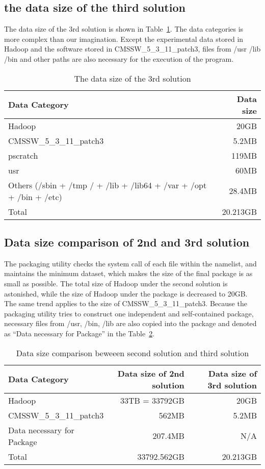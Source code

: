 \documentclass{article}
\begin{document}
\subsection{ the data size of the third solution}
\indent The data size of the 3rd solution is shown in Table~\ref{table:datasize-3rd}. The data categories is more complex than our imagination. Except the experimental data stored in Hadoop and the software stored in CMSSW\_5\_3\_11\_patch3, files from /usr /lib /bin and other paths are also necessary for the execution of the program.

\begin{table}
    \centering
    \begin{tabular}{|l|r|}
    \hline
    Data Category & Data size \\ \hline
    Hadoop & 20GB \\ \hline
    CMSSW\_5\_3\_11\_patch3 & 5.2MB \\ \hline
    pscratch & 119MB \\ \hline
    usr & 60MB \\ \hline
    Others (/sbin + /tmp / + /lib + /lib64 + /var + /opt + /bin + /etc) & 28.4MB \\ \hline
    Total & 20.213GB \\ \hline
    \end{tabular}
    \caption{The data size of the 3rd solution}
    \label{table:datasize-3rd}
\end{table}    

\subsection{ Data size comparison of 2nd and 3rd solution}
\indent The packaging utility checks the system call of each file within the namelist, and maintains the minimum dataset, which makes the size of the final package is as small as possible. The total size of Hadoop under the second solution is astonished, while the size of Hadoop under the package is decreased to 20GB. The same trend applies to the size of CMSSW\_5\_3\_11\_patch3. Because the packaging utility tries to construct one independent and self-contained package, necessary files  from /usr, /bin, /lib are also copied into the package and denoted as “Data necessary for Package” in the Table~\ref{table:datasize-2nd3rd}.

\begin{table}
    \centering
    \begin{tabular}{|l|r|r|}
    \hline
     Data Category & Data size of 2nd solution & Data size of 3rd solution \\ \hline
     Hadoop & 33TB = 33792GB & 20GB \\ \hline
     CMSSW\_5\_3\_11\_patch3 & 562MB & 5.2MB \\ \hline
     Data necessary for Package & 207.4MB & N/A \\ \hline
     Total & 33792.562GB & 20.213GB \\ \hline
    \end{tabular}
    \caption{Data size comparison beweeen second solution and third solution}
    \label{table:datasize-2nd3rd}
\end{table}
\end{document}

